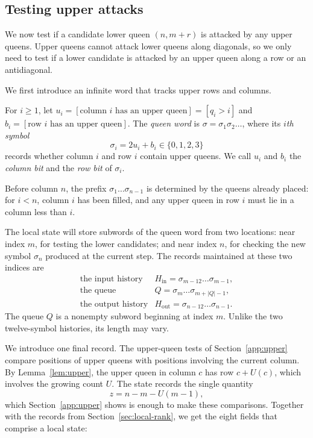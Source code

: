 \subsection{Testing upper attacks}\label{sec:upper-word}

We now test if a candidate lower queen $(n,m+r)$ is attacked
by any upper queens. Upper queens cannot attack lower queens
along diagonals, so we only need to test if a lower candidate
is attacked by an upper queen along a row or an antidiagonal.

We first introduce an infinite word that tracks upper rows and columns.

\begin{definition}\label{def:queen-word}
For $i\ge1$, let $u_i=[\text{column $i$ has an upper queen}]=[q_i>i]$ and
$b_i=[\text{row $i$ has an upper queen}]$.
The \emph{queen word} is $\sigma=\sigma_1\sigma_2\dots$, where
its \emph{$i$th symbol}
\[
 \sigma_i=2u_i+b_i\in\{0,1,2,3\}
\]
records whether column $i$ and row $i$ contain upper queens.
We call $u_i$ and $b_i$ the \emph{column bit} and the
\emph{row bit} of $\sigma_i$.
\end{definition}

Before column $n$, the prefix $\sigma_1\dots\sigma_{n-1}$
is determined by the queens already placed: for $i<n$,
column $i$ has been filled, and any upper queen in row $i$
must lie in a column less than $i$.

The local state will store subwords of the queen word from
two locations: near index $m$, for testing the lower candidates;
and near index $n$, for checking the new symbol $\sigma_n$
produced at the current step.
The records maintained at these two indices are
\[
 \begin{array}{ll}
 \text{the input history}&H_{\mathrm{in}}=\sigma_{m-12}\dots\sigma_{m-1},\\
 \text{the queue}&Q=\sigma_m\dots\sigma_{m+|Q|-1},\\
 \text{the output history}&H_{\mathrm{out}}=\sigma_{n-12}\dots\sigma_{n-1}.
 \end{array}
\]
The queue $Q$ is a nonempty subword beginning at index $m$.
Unlike the two twelve-symbol histories, its length may vary.

We introduce one final record. The upper-queen tests of
Section~\ref{app:upper} compare positions of upper queens with
positions involving the current column. By Lemma~\ref{lem:upper},
the upper queen in column $c$ has row $c+U(c)$, which involves the
growing count $U$. The state records the single quantity
\[
 z=n-m-U(m-1),
\]
which Section~\ref{app:upper} shows is enough to make these
comparisons. Together with the records from
Section~\ref{sec:local-rank}, we get the eight fields that comprise
a local state:

